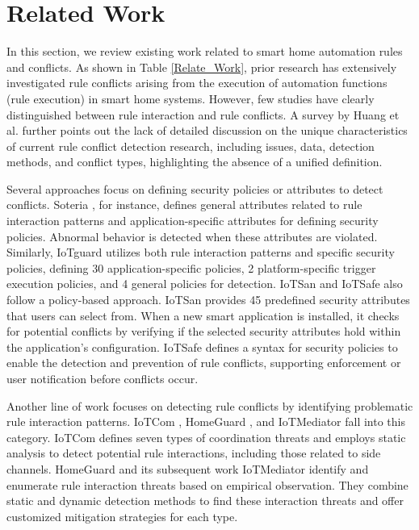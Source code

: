 \section{Related Work}

In this section, we review existing work related to smart home automation rules and conflicts. As shown in Table \ref{Relate_Work}, prior research has extensively investigated rule conflicts arising from the execution of automation functions (rule execution) in smart home systems. However, few studies have clearly distinguished between rule interaction and rule conflicts. A survey by Huang et al. \cite{huang2023survey} further points out the lack of detailed discussion on the unique characteristics of current rule conflict detection research, including issues, data, detection methods, and conflict types, highlighting the absence of a unified definition.

Several approaches focus on defining security policies or attributes to detect conflicts. Soteria \cite{celik2018soteria}, for instance, defines general attributes related to rule interaction patterns and application-specific attributes for defining security policies. Abnormal behavior is detected when these attributes are violated. Similarly, IoTguard \cite{celik2019iotguard} utilizes both rule interaction patterns and specific security policies, defining 30 application-specific policies, 2 platform-specific trigger execution policies, and 4 general policies for detection. IoTSan \cite{nguyen2018iotsan} and IoTSafe \cite{ding2021iotsafe} also follow a policy-based approach. IoTSan provides 45 predefined security attributes that users can select from. When a new smart application is installed, it checks for potential conflicts by verifying if the selected security attributes hold within the application's configuration. IoTSafe defines a syntax for security policies to enable the detection and prevention of rule conflicts, supporting enforcement or user notification before conflicts occur.

Another line of work focuses on detecting rule conflicts by identifying problematic rule interaction patterns. IoTCom \cite{alhanahnah2022iotcom}, HomeGuard \cite{inproceedings}, and IoTMediator \cite{chi2023detecting} fall into this category. IoTCom defines seven types of coordination threats and employs static analysis to detect potential rule interactions, including those related to side channels. HomeGuard and its subsequent work IoTMediator identify and enumerate rule interaction threats based on empirical observation. They combine static and dynamic detection methods to find these interaction threats and offer customized mitigation strategies for each type.


